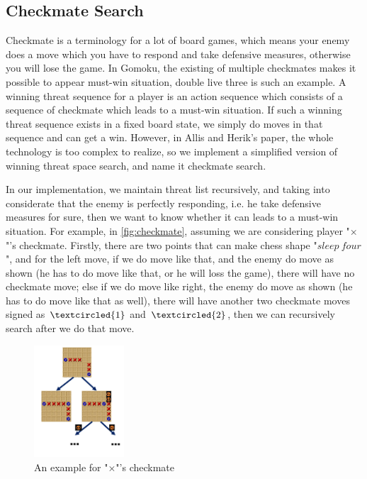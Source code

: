 \documentclass[sigconf, nonacm]{acmart}
\begin{document}
\subsection{Checkmate Search}
\quad Checkmate is a terminology for a lot of board games, which means your enemy does a move which you have to respond and take defensive measures, otherwise you will lose the game. 
%
In Gomoku, the existing of multiple checkmates makes it possible to appear must-win situation, double live three is such an example.
%
A winning threat sequence for a player is an action sequence which consists of a sequence of checkmate which leads to a must-win situation\cite{threat}.
%
If such a winning threat sequence exists in a fixed board state, we simply do moves in that sequence and can get a win.
%
However, in Allis and Herik's paper\cite{threat}, the whole technology is too complex to realize, so we implement a simplified version of winning threat space search, and name it checkmate search.

In our implementation, we maintain threat list recursively, and taking into considerate that the enemy is perfectly responding, i.e. he take defensive measures for sure, then we want to know whether it can leads to a must-win situation. 
%
For example, in \autoref{fig:checkmate}, assuming we are considering player "$\times$"'s checkmate.
%
Firstly, there are two points that can make chess shape "$sleep\ four$", and for the left move, if we do move like that, and the enemy do move as shown (he has to do move like that, or he will loss the game), there will have no checkmate move; else if we do move like right, the enemy do move as shown (he has to do move like that as well), there will have another two checkmate moves signed as $\textcircled{1}$ and $\textcircled{2}$, then we can recursively search after we do that move. 
\begin{figure}[h]
  \centering
  \includegraphics[width=0.3\textwidth]{figures/checkmate.png}
  \caption{An example for "$\times$"'s checkmate}
  \label{fig:checkmate}
\end{figure}
\end{document}
